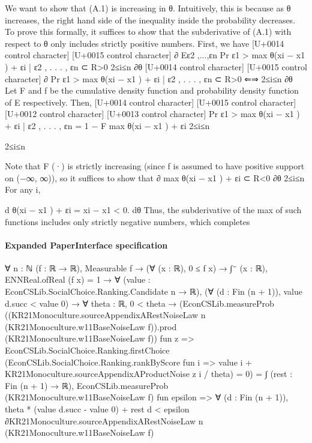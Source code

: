 \documentclass[10pt]{article}
\begin{document}
\begin{ReviewVerbatim}
We want to show that (A.1) is increasing in θ. Intuitively, this is because as θ increases, the right hand
side of the inequality inside the probability decreases. To prove this formally, it suffices to show that the
subderivative of (A.1) with respect to θ only includes strictly positive numbers. First, we have
[U+0014 control character]
[U+0015 control character]
∂
Eε2 ,...,εn Pr ε1 > max θ(xi − x1 ) + εi | ε2 , . . . , εn ⊂ R>0
2≤i≤n
∂θ
[U+0014 control character]
[U+0015 control character]
∂
Pr ε1 > max θ(xi − x1 ) + εi | ε2 , . . . , εn ⊂ R>0
⇐⇒
2≤i≤n
∂θ
Let F and f be the cumulative density function and probability density function of E respectively. Then,
[U+0014 control character]
[U+0015 control character]
[U+0012 control character]
[U+0013 control character]
Pr ε1 > max θ(xi − x1 ) + εi | ε2 , . . . , εn = 1 − F max θ(xi − x1 ) + εi
2≤i≤n

2≤i≤n

Note that F (·) is strictly increasing (since f is assumed to have positive support on (−∞, ∞)), so it suffices
to show that
∂
max θ(xi − x1 ) + εi ⊂ R<0
∂θ 2≤i≤n
For any i,

d
θ(xi − x1 ) + εi = xi − x1 < 0.
dθ
Thus, the subderivative of the max of such functions includes only strictly negative numbers, which completes
\end{ReviewVerbatim}


\paragraph{Expanded PaperInterface specification}
\begin{ReviewVerbatim}
∀ {n : ℕ} (f : ℝ → ℝ),
  Measurable f →
    (∀ (x : ℝ), 0 ≤ f x) →
      ∫⁻ (x : ℝ), ENNReal.ofReal (f x) = 1 →
        ∀ (value : EconCSLib.SocialChoice.Ranking.Candidate n → ℝ),
          (∀ (d : Fin (n + 1)), value d.succ < value 0) →
            ∀ {theta : ℝ},
              0 < theta →
                (EconCSLib.measureProb
                    ((KR21Monoculture.sourceAppendixARestNoiseLaw n (KR21Monoculture.w11BaseNoiseLaw f)).prod
                      (KR21Monoculture.w11BaseNoiseLaw f))
                    fun z =>
                    EconCSLib.SocialChoice.Ranking.firstChoice
                        (EconCSLib.SocialChoice.Ranking.rankByScore fun i =>
                          value i + KR21Monoculture.sourceAppendixAProductNoise z i / theta) =
                      0) =
                  ∫ (rest : Fin (n + 1) → ℝ),
                    EconCSLib.measureProb (KR21Monoculture.w11BaseNoiseLaw f) fun epsilon =>
                      ∀ (d : Fin (n + 1)),
                        theta * (value d.succ - value 0) + rest d <
                          epsilon ∂KR21Monoculture.sourceAppendixARestNoiseLaw n (KR21Monoculture.w11BaseNoiseLaw f)
\end{ReviewVerbatim}
\end{document}
